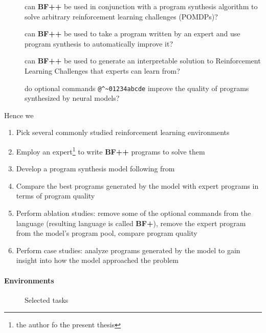 \begin{description}
    \item[\rqbfpp] can \textbf{BF++} be used in conjunction with a program synthesis algorithm to solve arbitrary reinforcement learning challenges (POMDPs)?
    \item[\rqbfppexpert] can \textbf{BF++} be used to take a program written by an expert and use program synthesis to automatically improve it?
    \item[\rqbfppexplainable] can \textbf{BF++} be used to generate an interpretable solution to Reinforcement Learning Challenges that experts can learn from?
    \item[\rqbfppablation] do optional commands \verb|@^~01234abcde| improve the quality of programs synthesized by neural models?
\end{description}

Hence we

\begin{enumerate}
    \item Pick several commonly studied reinforcement learning environments
    \item Employ an expert\footnote{the author fo the present thesis} to write \textbf{BF++} programs to solve them
    \item Develop a program synthesis model following from \cite{abolafiaNeuralProgramSynthesis2018}
    \item Compare the best programs generated by the model with expert programs in terms of program quality
    \item Perform ablation studies: remove some of the optional commands from the language (resulting language is called \textbf{BF+}), remove the expert program from the model's program pool, compare program quality
    \item Perform case studies: analyze programs generated by the model to gain insight into how the model approached the problem
\end{enumerate}

\paragraph{Environments}
\label{sec:envs}

\begin{figure}
    \centering
    \caption{Selected tasks}
    \label{fig:envs}
\end{figure}

